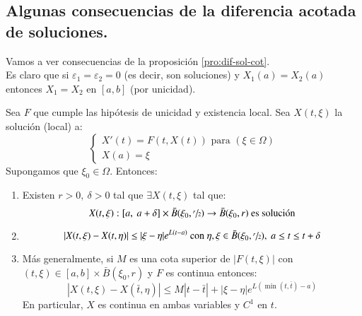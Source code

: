 \subsection{Algunas consecuencias de la diferencia acotada de soluciones.}

Vamos a ver consecuencias de la proposición \ref{pro:dif-sol-cot}.\\
 Es claro que si $\varepsilon_1 = \varepsilon_2 = 0$ (es decir, son soluciones) y $X_1(a) = X_2(a)$ entonces $X_1 = X_2$ en $[a, b]$ (por unicidad).
\begin{pro}
    Sea $F$ que cumple las hipótesis de unicidad y existencia local. Sea $X(t, \xi)$ la solución (local) a:
    $$
        \begin{cases}
            X'(t) = F(t, X(t)) \text{ para } (\xi \in \Omega)\\
            X(a) = \xi
        \end{cases}
    $$
    Supongamos que $\xi_0 \in \Omega$. Entonces:
    \begin{enumerate}
        \item Existen $r>0,\ \delta > 0$ tal que $\exists X(t, \xi)$ tal que:
            $$
                X(t, \xi) : [a,\ a+\delta ] \times \bar{B}(\xi_0, \sfrac{r}{2}) \to \bar{B}(\xi_0, r) \text{ es solución}
            $$
        \item
        $$
            |X(t, \xi) - X(t, \eta)| \leq |\xi - \eta| e^{L(t-a)} \text{ con } \eta,\xi \in \bar{B}(\xi_0, \sfrac{r}{2}),\ a\leq t\leq t+\delta
        $$
        \item Más generalmente, si $M$ es una cota superior de $|F(t, \xi)|$ con $(t,\xi) \in [a,b]\times\bar{B}(\xi_0, r)$ y $F$ es continua entonces:
        $$
            |X(t, \xi) - X(\bar{t}, \eta)| \leq M |t - \bar{t}| + |\xi - \eta| e^{L(\min(t,\bar{t})-a)}
        $$
        En particular, $X$ es continua en ambas variables y $C^1$ en $t$.
    \end{enumerate}
\end{pro}
